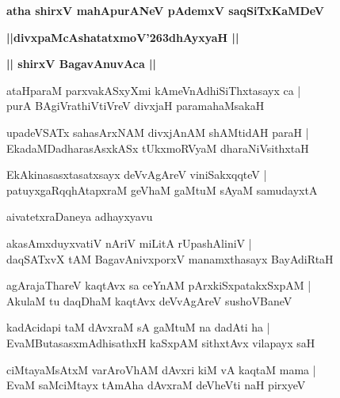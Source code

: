\documentclass[twoside,12pt,openright]{book}
\def\S{\char'263}
\newcounter{shloka}[chapter]
\def\uvaca#1{\centerline{{\large\textbf{#1}}}}
\begin{document}
\begin{center}
{\LARGE\bfseries atha shirxV mahApurANeV pAdemxV saqSiTxKaMDeV}
\end{center}

\begin{center}
{\LARGE\bfseries ||divxpaMcAshatatxmoV\S dhAyxyaH || }
\end{center}

\uvaca{|| shirxV BagavAnuvAca ||}

\begin{shloka}%
ataHparaM parxvakASxyXmi kAmeVnAdhiSiThxtasayx ca |\\
purA BAgiVrathiVtiVreV divxjaH paramahaMsakaH 
\end{shloka}

\begin{shloka}%
upadeVSATx sahasArxNAM divxjAnAM shAMtidAH paraH |\\
EkadaMDadharasAsxkASx tUkxmoRVyaM dharaNiVsithxtaH 
\end{shloka}

\begin{shloka}%
EkAkinasasxtasatxsayx deVvAgAreV viniSakxqqteV |\\
patuyxgaRqqhAtapxraM geVhaM gaMtuM sAyaM samudayxtA 
\end{shloka}

\begin{center}
aivatetxraDaneya adhayxyavu
\end{center}

\begin{shloka}%
akasAmxduyxvatiV nAriV miLitA rUpashAliniV |\\
daqSATxvX tAM BagavAnivxporxV manamxthasayx BayAdiRtaH 
\end{shloka}

\begin{shloka}%
agArajaThareV kaqtAvx sa ceYnAM pArxkiSxpatakxSxpAM |\\
AkulaM tu daqDhaM kaqtAvx deVvAgAreV sushoVBaneV 
\end{shloka}

\begin{shloka}%
kadAcidapi taM dAvxraM sA gaMtuM na dadAti ha |\\
EvaMButasasxmAdhisathxH kaSxpAM sithxtAvx vilapayx saH 
\end{shloka}

\begin{shloka}%
ciMtayaMsAtxM varAroVhAM dAvxri kiM vA kaqtaM mama |\\
EvaM saMciMtayx tAmAha dAvxraM deVheVti naH pirxyeV 
\end{shloka}
\end{document}
